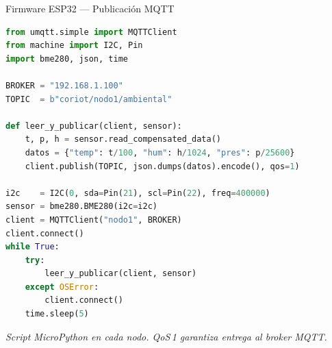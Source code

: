 \documentclass[aspectratio=169, 12pt]{beamer}
\begin{document}
\begin{frame}[fragile]{Firmware ESP32 --- Publicación MQTT}
  \begin{tcolorbox}[cajaCode, top=2pt, bottom=2pt]
\begin{lstlisting}[language=Python]
from umqtt.simple import MQTTClient
from machine import I2C, Pin
import bme280, json, time

BROKER = "192.168.1.100"
TOPIC  = b"coriot/nodo1/ambiental"

def leer_y_publicar(client, sensor):
    t, p, h = sensor.read_compensated_data()
    datos = {"temp": t/100, "hum": h/1024, "pres": p/25600}
    client.publish(TOPIC, json.dumps(datos).encode(), qos=1)

i2c    = I2C(0, sda=Pin(21), scl=Pin(22), freq=400000)
sensor = bme280.BME280(i2c=i2c)
client = MQTTClient("nodo1", BROKER)
client.connect()
while True:
    try:
        leer_y_publicar(client, sensor)
    except OSError:
        client.connect()
    time.sleep(5)
\end{lstlisting}
  \end{tcolorbox}
  {\small\color{GrisMedio}\itshape
    Script MicroPython en cada nodo. QoS\,1 garantiza entrega al broker MQTT.}
\end{frame}
\end{document}
